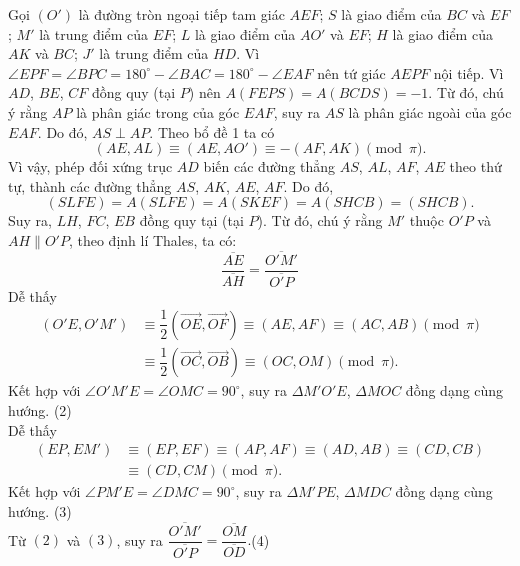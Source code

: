 \begin{bt}
{\begin{center}
		\end{center}
		Gọi $(O')$ là đường tròn ngoại tiếp tam giác $AEF$; $S$ là giao điểm của $BC$ và $EF$; $M'$ là trung điểm của $EF$; $L$ là giao điểm của $AO'$ và $EF$; $H$ là giao điểm của $AK$ và $BC$; $J'$ là trung điểm của $HD$. 	
		Vì $\angle EPF=\angle BPC=180^\circ-\angle BAC=180^\circ-\angle EAF$ nên tứ giác $AEPF$ nội tiếp. 		
		Vì $AD$, $BE$, $CF$ đồng quy (tại $P$) nên $A(FEPS)=A(BCDS)=-1$. Từ đó, chú ý rằng $AP$ là phân giác trong của góc $EAF$, suy ra $AS$ là phân giác ngoài của góc $EAF$. Do đó, $AS\perp AP$. 		
		Theo bổ đề 1 ta có
		$$(AE,AL)\equiv(AE,AO')\equiv -(AF,AK)\pmod\pi.$$
		Vì vậy, phép đối xứng trục $AD$ biến các đường thẳng $AS$, $AL$, $AF$, $AE$ theo thứ tự, thành các đường thẳng $AS$, $AK$, $AE$, $AF$. Do đó,
		$$(SLFE)=A(SLFE)=A(SKEF)=A(SHCB)=(SHCB).$$
		Suy ra, $LH$, $FC$, $EB$ đồng quy tại (tại $P$). Từ đó, chú ý rằng $M'$ thuộc $O'P$ và $AH\parallel O'P$, theo định lí Thales, ta có: \[\dfrac{\overline{AE}}{\overline{AH}}=\dfrac{\overline{O'M'}}{\overline{O'P}}\tag{1}\]
	Dễ thấy {\allowdisplaybreaks\begin{align*}
			(O'E,O'M')&\equiv\dfrac{1}{2}\left(\vec{OE},\vec{OF}\right)\equiv(AE,AF)\equiv (AC,AB)\pmod\pi\\&\equiv\dfrac{1}{2}\left(\vec{OC},\vec{OB}\right)\equiv(OC,OM)\pmod\pi.
		\end{align*}}Kết hợp với $\angle O'M'E=\angle OMC=90^\circ$, suy ra  $\Delta M'O'E$, $\Delta MOC$ đồng dạng cùng hướng. \hfill(2)\\		
		Dễ thấy
		{\allowdisplaybreaks\begin{align*}
			(EP,EM')&\equiv(EP,EF)\equiv(AP,AF)\equiv(AD,AB)\equiv(CD,CB)\\&\equiv(CD,CM)\pmod\pi.
		\end{align*}}Kết hợp với $\angle PM'E=\angle DMC=90^\circ$, suy ra $\Delta M'PE$, $\Delta MDC$ đồng dạng cùng hướng. \hfill(3)\\		
		Từ $(2)$ và $(3)$, suy ra $\dfrac{ \overline{O'M'} }{\overline{O'P}}=\dfrac{\overline{OM}}{\overline{OD}}.$\hfill(4)\\	
}
\end{bt}
